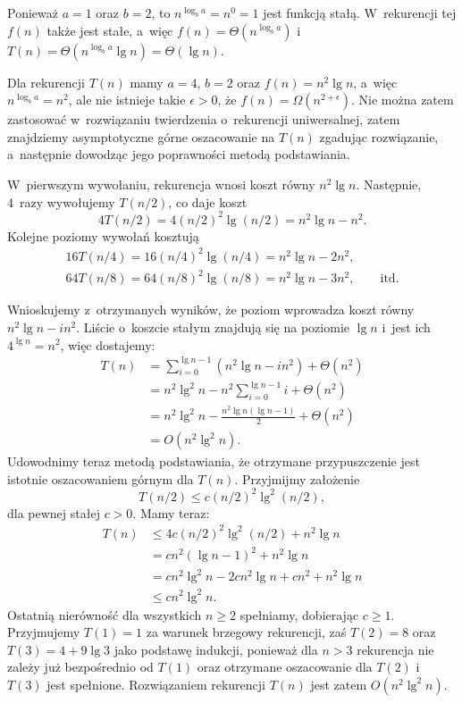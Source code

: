 \exercise %
Ponieważ $a=1$ oraz $b=2$, to $n^{\log_ba}=n^0=1$ jest funkcją stałą. W~rekurencji tej $f(n)$ także jest stałe, a~więc $f(n)=\Theta(n^{\log_ba})$ i~$T(n)=\Theta(n^{\log_ba}\lg n)=\Theta(\lg n)$.

\exercise %
Dla rekurencji $T(n)$ mamy $a=4$, $b=2$ oraz $f(n)=n^2\lg n$, a~więc $n^{\log_ba}=n^2$, ale nie istnieje takie $\epsilon>0$, że $f(n)=\Omega(n^{2+\epsilon})$. Nie można zatem zastosować w~rozwiązaniu twierdzenia o~rekurencji uniwersalnej, zatem znajdziemy asymptotyczne górne oszacowanie na $T(n)$ zgadując rozwiązanie, a~następnie dowodząc jego poprawności metodą podstawiania.

W~pierwszym wywołaniu, rekurencja wnosi koszt równy $n^2\lg n$. Następnie, 4~razy wywołujemy $T(n/2)$, co daje koszt
\[
	4T(n/2) = 4(n/2)^2\lg(n/2) = n^2\lg n-n^2.
\]
Kolejne poziomy wywołań kosztują
\begin{gather*}
	16T(n/4) = 16(n/4)^2\lg(n/4) = n^2\lg n-2n^2, \qquad\phantom{\text{itd.}} \\
	64T(n/8) = 64(n/8)^2\lg(n/8) = n^2\lg n-3n^2, \qquad\text{itd.}
\end{gather*}

Wnioskujemy z~otrzymanych wyników, że  poziom wprowadza koszt równy $n^2\lg n-in^2$. Liście o~koszcie stałym znajdują się na poziomie $\lg n$ i~jest ich $4^{\lg n}=n^2$, więc dostajemy:
\begin{align*}
	T(n) &= \sum_{i=0}^{\lg n-1}(n^2\lg n-in^2)+\Theta(n^2) \\
	&= n^2\lg^2n-n^2\sum_{i=0}^{\lg n-1}i+\Theta(n^2) \\[1mm]
	&= n^2\lg^2n-\frac{n^2\lg n(\lg n-1)}{2}+\Theta(n^2) \\[1mm]
	&= O(n^2\lg^2n).
\end{align*}
Udowodnimy teraz metodą podstawiania, że otrzymane przypuszczenie jest istotnie oszacowaniem górnym dla $T(n)$. Przyjmijmy założenie
\[
	T(n/2) \le c(n/2)^2\lg^2(n/2),
\]
dla pewnej stałej $c>0$. Mamy teraz:
\begin{align*}
	T(n) &\le 4c(n/2)^2\lg^2(n/2)+n^2\lg n \\
	&= cn^2(\lg n-1)^2+n^2\lg n \\
	&= cn^2\lg^2n-2cn^2\lg n+cn^2+n^2\lg n \\
	&\le cn^2\lg^2n.
\end{align*}
Ostatnią nierówność dla wszystkich $n\ge2$ spełniamy, dobierając $c\ge1$. Przyjmujemy $T(1)=1$ za warunek brzegowy rekurencji, zaś $T(2)=8$ oraz $T(3)=4+9\lg3$ jako podstawę indukcji, ponieważ dla $n>3$ rekurencja nie zależy już bezpośrednio od $T(1)$ oraz otrzymane oszacowanie dla $T(2)$ i~$T(3)$ jest spełnione. Rozwiązaniem rekurencji $T(n)$ jest zatem $O(n^2\lg^2n)$.

